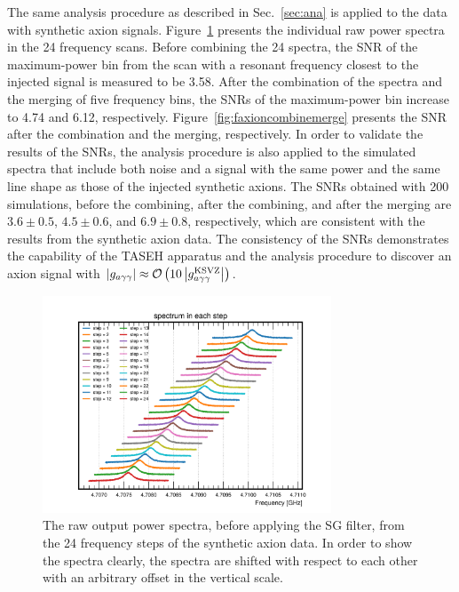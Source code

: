 \documentclass[%
reprint, %
superscriptaddress,
 amsmath,amssymb,
 aps
]{revtex4-2}
\begin{document}
The same analysis procedure as described in Sec.~\ref{sec:ana} is applied 
to the data with synthetic axion signals. 
Figure~\ref{fig:faxionstep} presents the individual raw power spectra in 
the 24 frequency scans. Before combining 
the 24 spectra, the SNR of the maximum-power bin from the scan with a resonant 
frequency closest to the injected signal is measured to be 
3.58. 
After the combination of the spectra and the merging of five frequency 
bins, the SNRs of the maximum-power bin increase to 4.74 and 6.12, 
respectively. Figure~\ref{fig:faxioncombinemerge} presents 
the SNR after the combination and the merging, respectively.    
In order to 
validate the results of the SNRs, the analysis procedure is also applied  
to the simulated spectra that include both noise and a signal with the 
same power and the same line shape as those of the injected synthetic axions. 
The SNRs obtained with 200 simulations, before 
the combining, after the combining, and after the merging are 
$3.6\pm 0.5$, $4.5\pm0.6$, and $6.9\pm0.8$, respectively, 
which are 
consistent with the results from the synthetic axion data.  
The consistency of the SNRs demonstrates 
the capability of the TASEH apparatus and the analysis procedure to discover 
an axion signal with 
$\left|g_{a\gamma\gamma}\right|\approx {\cal O}\left(10\left|g_{a\gamma\gamma}^\text{KSVZ}\right|\right)$.


\begin{figure}[htbp]                                                                                                  
    \centering                                                                                                                       
    \includegraphics[width=8.6cm]{Figure5.png}
 \caption{The raw output power spectra, before applying the 
 SG filter, from the 24 frequency steps of the synthetic axion 
data. In order to show the spectra clearly, the spectra are shifted 
with respect to each other with an arbitrary offset in the vertical scale.}                
\label{fig:faxionstep}                                                                                                            
\end{figure}                       
\end{document}
